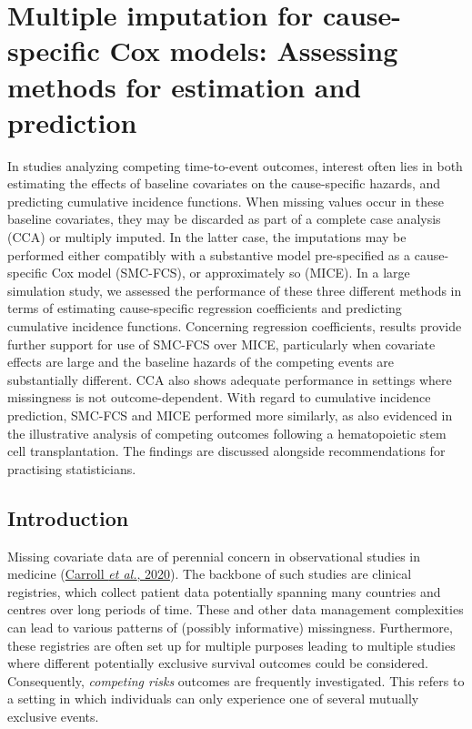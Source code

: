 \documentclass[
  letterpaper,
  DIV=11,
  numbers=noendperiod]{scrreprt}
\begin{document}

\hypertarget{multiple-imputation-for-cause-specific-cox-models-assessing-methods-for-estimation-and-prediction}{%
\chapter{Multiple imputation for cause-specific Cox models: Assessing
methods for estimation and
prediction}\label{multiple-imputation-for-cause-specific-cox-models-assessing-methods-for-estimation-and-prediction}}

In studies analyzing competing time-to-event outcomes, interest often
lies in both estimating the effects of baseline covariates on the
cause-specific hazards, and predicting cumulative incidence functions.
When missing values occur in these baseline covariates, they may be
discarded as part of a complete case analysis (CCA) or multiply imputed.
In the latter case, the imputations may be performed either compatibly
with a substantive model pre-specified as a cause-specific Cox model
(SMC-FCS), or approximately so (MICE). In a large simulation study, we
assessed the performance of these three different methods in terms of
estimating cause-specific regression coefficients and predicting
cumulative incidence functions. Concerning regression coefficients,
results provide further support for use of SMC-FCS over MICE,
particularly when covariate effects are large and the baseline hazards
of the competing events are substantially different. CCA also shows
adequate performance in settings where missingness is not
outcome-dependent. With regard to cumulative incidence prediction,
SMC-FCS and MICE performed more similarly, as also evidenced in the
illustrative analysis of competing outcomes following a hematopoietic
stem cell transplantation. The findings are discussed alongside
recommendations for practising statisticians.

\hfill\break

\hypertarget{introduction-1}{%
\section{Introduction}\label{introduction-1}}

Missing covariate data are of perennial concern in observational studies
in medicine (\protect\hyperlink{ref-carrollHowAreMissing2020}{Carroll
\emph{et al.}, 2020}). The backbone of such studies are clinical
registries, which collect patient data potentially spanning many
countries and centres over long periods of time. These and other data
management complexities can lead to various patterns of (possibly
informative) missingness. Furthermore, these registries are often set up
for multiple purposes leading to multiple studies where different
potentially exclusive survival outcomes could be considered.
Consequently, \emph{competing risks} outcomes are frequently
investigated. This refers to a setting in which individuals can only
experience one of several mutually exclusive events.
\end{document}
